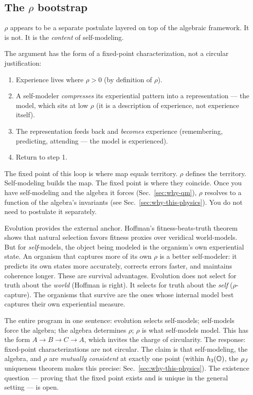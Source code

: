 \subsection{The $\rho$ bootstrap}
\label{subsec:rho-bootstrap}

$\rho$ appears to be a separate postulate layered on top of the
algebraic framework.  It is not.  It is the \emph{content} of
self-modeling.

The argument has the form of a fixed-point characterization, not a
circular justification:
\begin{enumerate}[nosep]
\item Experience lives where $\rho > 0$ (by definition of $\rho$).
\item A self-modeler \emph{compresses} its experiential pattern into a
  representation --- the model, which sits at low $\rho$ (it is a
  description of experience, not experience itself).
\item The representation feeds back and \emph{becomes} experience
  (remembering, predicting, attending --- the model is experienced).
\item Return to step 1.
\end{enumerate}
The fixed point of this loop is where map equals territory.  $\rho$
defines the territory.  Self-modeling builds the map.  The fixed point
is where they coincide.  Once you have self-modeling and the algebra it forces
(Sec.~\ref{sec:why-qm}), $\rho$ resolves to a function of the
algebra's invariants (see Sec.~\ref{sec:why-this-physics}).  You do
not need to postulate it separately.

Evolution provides the external anchor.  Hoffman's fitness-beats-truth
theorem~\citep{hoffman2015} shows that natural selection favors fitness
proxies over veridical world-models.  But for \emph{self}-models, the
object being modeled is the organism's own experiential state.  An
organism that captures more of its own $\rho$ is a better
self-modeler: it predicts its own states more accurately, corrects
errors faster, and maintains coherence longer.  These are survival
advantages.  Evolution does not select for truth about the
\emph{world} (Hoffman is right).  It selects for truth about the
\emph{self} ($\rho$-capture).  The organisms that survive are the ones
whose internal model best captures their own experiential measure.

The entire program in one sentence: evolution selects self-models;
self-models force the algebra; the algebra determines $\rho$; $\rho$
is what self-models model.  This has the form $A \to B \to C \to A$,
which invites the charge of circularity.  The response: fixed-point
characterizations are not circular.  The claim is that self-modeling,
the algebra, and $\rho$ are \emph{mutually consistent} at exactly one
point (within $h_3(\mathbb{O})$, the $\rho_J$ uniqueness theorem makes this
precise: Sec.~\ref{sec:why-this-physics}).  The existence question ---
proving that the fixed point exists and is unique in the general
setting --- is open.

